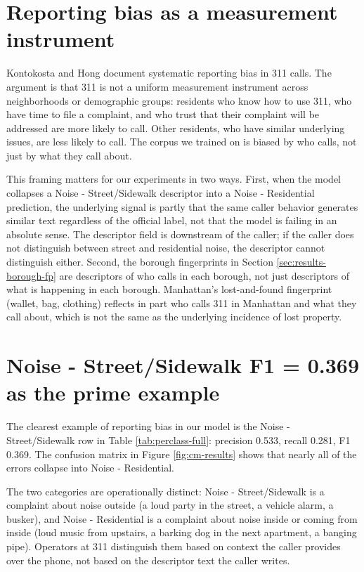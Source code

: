 \documentclass[11pt,letterpaper]{book}
\begin{document}
\section{Reporting bias as a measurement instrument}

Kontokosta and Hong \cite{kontokosta2021} document systematic reporting bias in 311 calls. The argument is that 311 is not a uniform measurement instrument across neighborhoods or demographic groups: residents who know how to use 311, who have time to file a complaint, and who trust that their complaint will be addressed are more likely to call. Other residents, who have similar underlying issues, are less likely to call. The corpus we trained on is biased by who calls, not just by what they call about.

This framing matters for our experiments in two ways. First, when the model collapses a Noise - Street/Sidewalk descriptor into a Noise - Residential prediction, the underlying signal is partly that the same caller behavior generates similar text regardless of the official label, not that the model is failing in an absolute sense. The descriptor field is downstream of the caller; if the caller does not distinguish between street and residential noise, the descriptor cannot distinguish either. Second, the borough fingerprints in Section \ref{sec:results-borough-fp} are descriptors of who calls in each borough, not just descriptors of what is happening in each borough. Manhattan's lost-and-found fingerprint (wallet, bag, clothing) reflects in part who calls 311 in Manhattan and what they call about, which is not the same as the underlying incidence of lost property.

\section{Noise - Street/Sidewalk F1 = 0.369 as the prime example}

The clearest example of reporting bias in our model is the Noise - Street/Sidewalk row in Table \ref{tab:perclass-full}: precision 0.533, recall 0.281, F1 0.369. The confusion matrix in Figure \ref{fig:cm-results} shows that nearly all of the errors collapse into Noise - Residential.

The two categories are operationally distinct: Noise - Street/Sidewalk is a complaint about noise outside (a loud party in the street, a vehicle alarm, a busker), and Noise - Residential is a complaint about noise inside or coming from inside (loud music from upstairs, a barking dog in the next apartment, a banging pipe). Operators at 311 distinguish them based on context the caller provides over the phone, not based on the descriptor text the caller writes.
\end{document}
